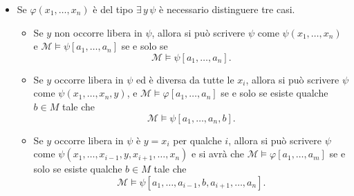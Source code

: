 {\begin{itemize}
        \item Se $ \varphi(x_1,\dots,x_{n} ) $ è del tipo $ \exists\, y\,\psi $ è necessario distinguere tre casi. \begin{itemize}
            \item Se $ y $ non occorre libera in $ \psi $, allora si può scrivere $ \psi $ come $ \psi(x_1,\dots,x_{n} ) $ e $ \mathcal{M}\vDash\psi[a_1,\dots,a_{n} ] $ se e solo se \[
                \mathcal{M}\vDash \psi[a_1,\dots,a_{n} ].
            \]
            \item Se $ y $ occorre libera in $ \psi $ ed è diversa da tutte le $ x_{i}  $, allora si può scrivere $ \psi $ come $ \psi(x_1,\dots,x_{n},y ) $, e $ \mathcal{M}\vDash\varphi[a_1,\dots,a_{n} ] $ se e solo se esiste qualche $ b \in M $ tale che \[
                \mathcal{M}\vDash \psi[a_1,\dots,a_{n},b ].
            \]
            \item Se $ y $ occorre libera in $ \psi $ è $ y=x_{i}  $ per qualche $ i $, allora si può scrivere $ \psi $ come $ \psi(x_1,\dots,x_{i-1},y,x_{i+1},\dots,x_{n}   ) $ e si avrà che $ \mathcal{M}\vDash\varphi[a_1,\dots,a_{m} ] $ se e solo se esiste qualche $  b \in M $ tale che \[
                \mathcal{M}\vDash\psi[a_1,\dots,a_{i-1},b,a_{i+1},\dots,a_{n}].
            \]
        \end{itemize}
    \end{itemize}
}

